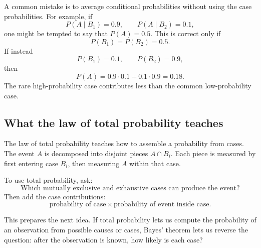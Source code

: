 A common mistake is to average conditional probabilities without using the case
probabilities. For example, if
\[
P(A\mid B_1)=0.9,\qquad P(A\mid B_2)=0.1,
\]
one might be tempted to say that \(P(A)=0.5\). This is correct only if
\[
P(B_1)=P(B_2)=0.5.
\]
If instead
\[
P(B_1)=0.1,\qquad P(B_2)=0.9,
\]
then
\[
P(A)=0.9\cdot0.1+0.1\cdot0.9=0.18.
\]
The rare high-probability case contributes less than the common low-probability
case.

\subsection*{What the law of total probability teaches}

The law of total probability teaches how to assemble a probability from cases.
The event \(A\) is decomposed into disjoint pieces \(A\cap B_i\). Each piece is
measured by first entering case \(B_i\), then measuring \(A\) within that case.

\begin{theorembox}
To use total probability, ask:
\[
\text{Which mutually exclusive and exhaustive cases can produce the event?}
\]
Then add the case contributions:
\[
\text{probability of case}\times\text{probability of event inside case}.
\]
\end{theorembox}

This prepares the next idea. If total probability lets us compute the probability
of an observation from possible causes or cases, Bayes' theorem lets us reverse
the question: after the observation is known, how likely is each case?
